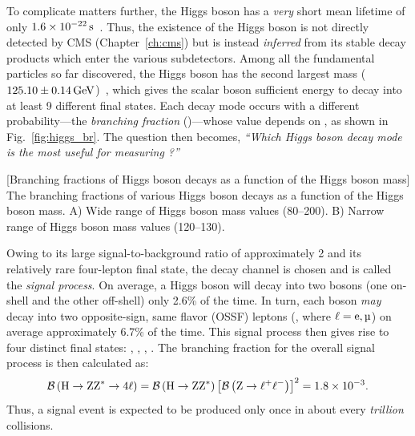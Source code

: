 To complicate matters further, the Higgs boson has a \emph{very} short mean lifetime of only $1.6 \times \text{10}^\text{$-$22}\,\text{s}$~\cite{particle_data_group_review_2020}. %
Thus, the existence of the Higgs boson is not directly detected by CMS (Chapter~\ref{ch:cms}) but is instead \emph{inferred} from its stable decay products which enter the various subdetectors.
Among all the fundamental particles so far discovered, the Higgs boson has the second largest mass ($125.10 \pm 0.14\,\text{Ge\hspace{-.08em}V}$)~\cite{particle_data_group_review_2020},
which gives the scalar boson sufficient energy to decay into at least 9 different final states.
Each decay mode occurs with a different probability---the \emph{branching fraction} (\br)---whose value depends on \mH, as shown in Fig.~\ref{fig:higgs_br}.
The question then becomes, \emph{``Which Higgs boson decay mode is the most useful for measuring \mH?''}
\begin{multiFigure}
	\centering
		[Branching fractions of Higgs boson decays as a function of the Higgs boson mass]
		{The branching fractions of various Higgs boson decays as a function of the Higgs boson mass.
		\;A) Wide range of Higgs boson mass values (80--200\GeV).
		\;B) Narrow range of Higgs boson mass values (120--130\GeV).
	}
	\label{fig:higgs_br}
\end{multiFigure} 

Owing to its large signal-to-background ratio of approximately 2
and its relatively rare four-lepton final state, the \hzzfourl decay channel is chosen and is called the \emph{signal process}.
On average, a Higgs boson will decay into two \PZ bosons (one on-shell and the other off-shell) only 2.6\% of the time. %
In turn, each \PZ boson \emph{may} decay into two opposite-sign, same flavor (OSSF) leptons (\ztolplm, where $\ell = \Pe, \Pmu$) on average approximately 6.7\% of the time. %
This signal process then gives rise to four distinct final states: \foure, \fourmu, \twoetwomu, \twomutwoe.
The branching fraction for the overall signal process is then calculated as: %
\begin{equation*}
    \mathcal{B} \left( \mathrm{H} \to \text{Z}\text{Z}^{\ast} \to 4\ell \right) = \mathcal{B} \left( \mathrm{H} \to \text{Z}\text{Z}^{\ast} \right) \left[ \mathcal{B} \left( \text{Z} \to \ell^+ \ell^- \right) \right]^2 = 1.8 \times \text{10}^\text{$-$3}.
\end{equation*}
Thus, a signal event is expected to be produced only once in about every \emph{trillion} \pp collisions.

